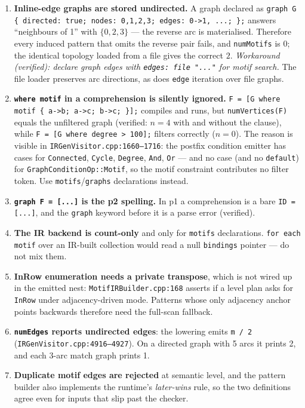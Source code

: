 \documentclass[11pt,a4paper]{article}
\newcommand{\code}[1]{\texttt{#1}}
\newcommand{\file}[1]{\texttt{#1}}
\begin{document}
\begin{enumerate}
  \item \textbf{Inline-edge graphs are stored undirected.}
  \label{sec:inline-trap}
  A graph declared as \code{graph G \{ directed: true; nodes: 0,1,2,3;
  edges: 0->1, ...; \};} answers ``neighbours of 1'' with $\{0,2,3\}$ --- the
  reverse arc is materialised. Therefore every induced pattern that omits the
  reverse pair fails, and \code{numMotifs} is $0$; the identical topology loaded
  from a file gives the correct $2$. \emph{Workaround (verified): declare graph
  edges with \code{edges: file "..."} for motif search.} The file loader
  preserves arc directions, as does \code{edge} iteration over file graphs.
  \item \textbf{\code{where motif} in a comprehension is silently ignored.}
  \code{F = [G where motif \{ a->b; a->c; b->c; \}];} compiles and runs, but
  \code{numVertices(F)} equals the unfiltered graph (verified: $n=4$ with and
  without the clause), while \code{F = [G where degree > 100];} filters
  correctly ($n=0$). The reason is visible in \file{IRGenVisitor.cpp:1660--1716}:
  the postfix condition emitter has cases for \code{Connected}, \code{Cycle},
  \code{Degree}, \code{And}, \code{Or} --- and no case (and no \code{default})
  for \code{GraphConditionOp::Motif}, so the motif constraint contributes no
  filter token. Use \code{motifs}/\code{graphs} declarations instead.
  \item \textbf{\code{graph F = [...]} is the p2 spelling.} In p1 a comprehension
  is a bare \code{ID = [...]}, and the \code{graph} keyword before it is a parse
  error (verified).
  \item \textbf{The IR backend is count-only} and only for \code{motifs}
  declarations. \code{for each motif} over an IR-built collection would read a
  null \code{bindings} pointer --- do not mix them.
  \item \textbf{InRow enumeration needs a private transpose}, which is not wired
  up in the emitted nest: \file{MotifIRBuilder.cpp:168} asserts if a level plan
  asks for \code{InRow} under adjacency-driven mode. Patterns whose only
  adjacency anchor points backwards therefore need the full-scan fallback.
  \item \textbf{\code{numEdges} reports undirected edges}: the lowering emits
  \code{m / 2} (\file{IRGenVisitor.cpp:4916--4927}). On a directed graph with 5
  arcs it prints 2, and each 3-arc match graph prints 1.
  \label{sec:m2}
  \item \textbf{Duplicate motif edges are rejected} at semantic level, and the
  pattern builder also implements the runtime's \emph{later-wins} rule, so the
  two definitions agree even for inputs that slip past the checker.
\end{enumerate}
\end{document}

